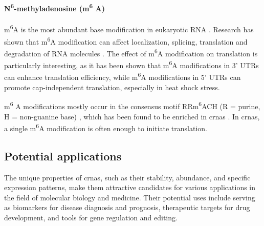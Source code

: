\paragraph{N\textsuperscript{6}-methyladenosine (m\textsuperscript{6}
    A)}  m\textsuperscript{6}A is the most abundant base modification in eukaryotic
RNA \supercite{yang_extensive_2017,li_pivotal_2014,wei_methylated_1975}.
Research has shown that m\textsuperscript{6}A modification can affect
localization, splicing, translation and degradation of RNA molecules
\supercite{yue_rna_2015,meyer_dynamic_2014}.
The effect of m\textsuperscript{6}A modification on translation is particularly
interesting, as it has been shown that m\textsuperscript{6}A modifications in
3' UTRs can enhance translation
efficiency\supercite{wang_n6-methyladenosine_2015}, while m\textsuperscript{6}A
modifications in 5' UTRs can promote cap-independent translation, especially in
heat shock stress\supercite{zhou_dynamic_2015,meyer_5_2015}.

m\textsuperscript{6}
A modifications mostly occur in the consensus motif RRm\textsuperscript{6}ACH
(R = purine, H = non-guanine base)
\supercite{csepany_sequence_1990,harper_sequence_1990}, which has been found to
be enriched in \glspl{crna} \supercite{yang_extensive_2017}.
In \glspl{crna}, a single m\textsuperscript{6}A modification is often enough to
initiate translation\supercite{yang_extensive_2017}.

\subsection{Potential applications}
\label{sec:circrna_applications}
The unique properties of \glspl{crna}, such as their stability, abundance, and
specific expression patterns, make them attractive candidates for various
applications in the field of molecular biology and medicine.
Their potential uses include serving as biomarkers for disease diagnosis and
prognosis, therapeutic targets for drug development, and tools for gene
regulation and editing.

